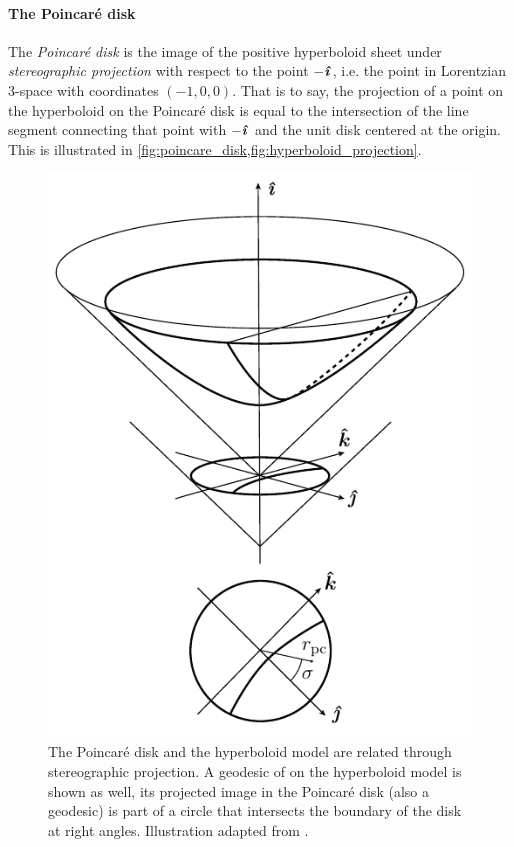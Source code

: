 \paragraph{The Poincaré disk} The \emph{Poincaré disk} is the image of the positive hyperboloid sheet under \emph{stereographic projection} with respect to the point \(-\quati\), i.e. the point in Lorentzian 3-space with coordinates \((-1, 0, 0)\). That is to say, the projection of a point on the hyperboloid on the Poincaré disk is equal to the intersection of the line segment connecting that point with \(-\quati\) and the unit disk centered at the origin. This is illustrated in \cref{fig:poincare_disk,fig:hyperboloid_projection}. 
\begin{figure}[ht!]
    \centering
    \includegraphics[scale=1]{media/other/poincare_disk-eps-converted-to}
    \caption{The Poincaré disk and the hyperboloid model are related through stereographic projection. A geodesic of on the hyperboloid model is shown as well, its projected image in the Poincaré disk (also a geodesic) is part of a circle that intersects the boundary of the disk at right angles. Illustration adapted from \citet{Balazs1986}.}
    \label{fig:poincare_disk}
\end{figure}

